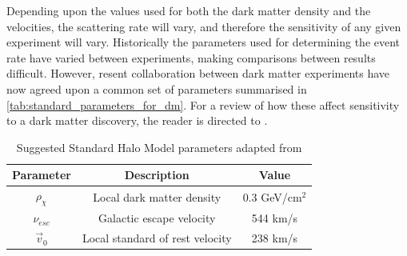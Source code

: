 \par
Depending upon the values used for both the dark matter density and the velocities, the scattering rate will vary, and therefore the sensitivity of any given experiment will vary.
Historically the parameters used for determining the event rate have varied between experiments, making comparisons between results difficult.
However, resent collaboration between dark matter experiments have now agreed upon a common set of parameters \cite{standard_halo_model_conventions_ref} summarised in \autoref{tab:standard_parameters_for_dm}.
For a review of how these affect sensitivity to a dark matter discovery, the reader is directed to \cite{dm_velocity_effects_on_limits_ref}.

\begin{table}[]
    \centering
    \begin{tabular}{c|c|c}
        Parameter                               & Description                       & Value         \\ \hline
        $\rho_{\chi}$                           & Local dark matter density         & 0.3 GeV/cm$^2$ \cite{shm_derivation_ref}           \\
        $\nu_{esc}$                             & Galactic escape velocity          & 544 km/s  \cite{dm_v_esc_ref}           \\
        $\Vec{v}_0$                             & Local standard of rest velocity   & 238 km/s   \cite{dm_v_0_ref}           
    \end{tabular}
    \caption{Suggested Standard Halo Model parameters adapted from \cite{standard_halo_model_conventions_ref}}
    \label{tab:standard_parameters_for_dm}
\end{table}

